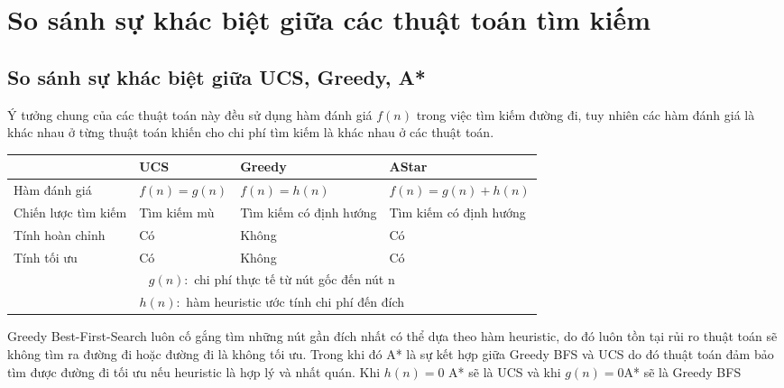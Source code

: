 \documentclass{article}
\begin{document}
\section{So sánh sự khác biệt giữa các thuật toán tìm kiếm}
\subsection{So sánh sự khác biệt giữa UCS, Greedy, A*}
\hspace{0.5in} Ý tưởng chung của các thuật toán này đều sử dụng hàm đánh giá $f(n)$ trong việc tìm kiếm đường đi, tuy nhiên các hàm đánh giá là khác nhau ở từng thuật toán khiến cho chi phí tìm kiếm là khác nhau ở các thuật toán.\\
\begin{table}[h!]
    \centering
    
    \begin{tabular}{ |p{2.5cm}|p{3cm}|p{3cm}|p{3cm}|  }\hline
    &   \textbf{UCS}    &  \textbf{Greedy}  &   \textbf{AStar}\\  
    \hline
    Hàm đánh giá&$f(n) = g(n)$&$f(n) = h(n)$&$f(n) = g(n) + h(n)$\\ \hline
    Chiến lược tìm kiếm&Tìm kiếm mù&Tìm kiếm có định hướng&Tìm kiếm có định hướng\\ \hline
    Tính hoàn chỉnh& Có&Không&Có \\ \hline
    Tính tối ưu&Có& Không& Có \\ \hline
    \multicolumn{4}{c}{\footnotesize $g(n):$ chi phí thực tế từ nút gốc đến nút n}\\
    \multicolumn{4}{c}{\footnotesize $h(n):$ hàm heuristic ước tính chi phí đến đích}\\
    \end{tabular}
\end{table}

\hspace{0.5in} Greedy Best-First-Search luôn cố gắng tìm những nút gần đích nhất có thể dựa theo hàm heuristic, do đó luôn tồn tại rủi ro thuật toán sẽ không tìm ra đường đi hoặc đường đi là không tối ưu. Trong khi đó A* là sự kết hợp giữa Greedy BFS và UCS do đó thuật toán đảm bảo tìm được đường đi tối ưu nếu heuristic là hợp lý và nhất quán. Khi $h(n) = 0$ A* sẽ là UCS và khi $g(n) = 0$A* sẽ là Greedy BFS
\end{document}
